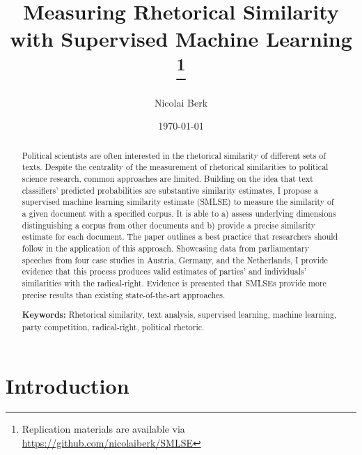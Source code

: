 \documentclass{article}
\title{Measuring Rhetorical Similarity with Supervised Machine Learning
\footnote{Replication materials are available via \href{https://github.com/nicolaiberk/SMLSE}{https://github.com/nicolaiberk/SMLSE}}
}
\author{Nicolai Berk}
\date{\today}
\begin{document}





\maketitle

\begin{abstract}
Political scientists are often interested in the rhetorical similarity of different sets of texts. Despite the centrality of the measurement of rhetorical similarities to political science research, common approaches are limited. Building on the idea that text classifiers' predicted probabilities are substantive similarity estimates, I propose a supervised machine learning similarity estimate (SMLSE) to measure the similarity of a given document with a specified corpus. It is able to a) assess underlying dimensions distinguishing a corpus from other documents and b) provide a precise similarity estimate for each document. The paper outlines a best practice that researchers should follow in the application of this approach. Showcasing data from parliamentary speeches from four case studies in Austria, Germany, and the Netherlands, I provide evidence that this process produces valid estimates of parties' and individuals' similarities with the radical-right. Evidence is presented that SMLSEs provide more precise results than existing state-of-the-art approaches.\par \medskip

\textbf{Keywords:} Rhetorical similarity, text analysis, supervised learning, machine learning, party competition, radical-right, political rhetoric.
\end{abstract}



\section{Introduction}
\label{sec:Intro}
\end{document}
